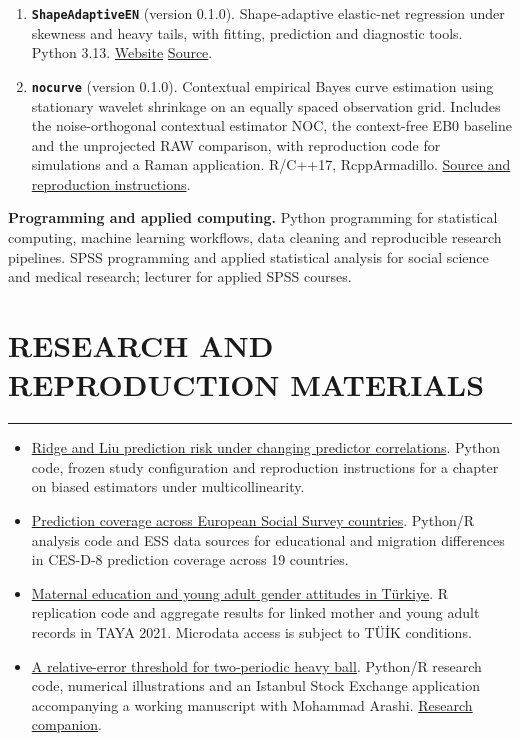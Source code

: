 \documentclass[10pt,letterpaper]{article}
\newcommand{\NewPart}[2]{%
	\Needspace{7\baselineskip}%
	\vspace{0.45em}%
	\section*{\sffamily\large\bfseries\color{MidnightBlue}\uppercase{#1} #2}%
	\vspace{-0.7em}\noindent\color{MidnightBlue}\rule{\textwidth}{0.55pt}\color{Black}\vspace{0.25em}}
\newenvironment{etaremune}{\begin{enumerate}}{\end{enumerate}}
\begin{document}
\begin{etaremune}
\item \textbf{\texttt{ShapeAdaptiveEN}} (version 0.1.0). Shape-adaptive elastic-net regression under skewness and heavy tails, with fitting, prediction and diagnostic tools. Python 3.13. \href{https://byuzbasi.github.io/shape-adaptive-robust-regression/}{Website} \textbar{} \href{https://github.com/byuzbasi/shape-adaptive-robust-regression}{Source}.

\item \textbf{\texttt{nocurve}} (version 0.1.0). Contextual empirical Bayes curve estimation using stationary wavelet shrinkage on an equally spaced observation grid. Includes the noise-orthogonal contextual estimator NOC, the context-free EB0 baseline and the unprojected RAW comparison, with reproduction code for simulations and a Raman application. R/C++17, RcppArmadillo. \href{https://github.com/byuzbasi/nocurve}{Source and reproduction instructions}.

\end{etaremune}

\smallskip
\noindent\textbf{Programming and applied computing.} Python programming for statistical computing, machine learning workflows, data cleaning and reproducible research pipelines. SPSS programming and applied statistical analysis for social science and medical research; lecturer for applied SPSS courses.


\NewPart{Research and Reproduction Materials}{}
\begin{itemize}
\item \href{https://github.com/byuzbasi/ridge-liu-correlation-risk}{Ridge and Liu prediction risk under changing predictor correlations}. Python code, frozen study configuration and reproduction instructions for a chapter on biased estimators under multicollinearity.
\item \href{https://github.com/byuzbasi/ess-selective-prediction}{Prediction coverage across European Social Survey countries}. Python/R analysis code and ESS data sources for educational and migration differences in CES-D-8 prediction coverage across 19 countries.
\item \href{https://github.com/byuzbasi/taya-maternal-education}{Maternal education and young adult gender attitudes in T\"{u}rkiye}. R replication code and aggregate results for linked mother and young adult records in TAYA 2021. Microdata access is subject to T\"{U}\.{I}K conditions.
\item \href{https://github.com/byuzbasi/periodic-momentum}{A relative-error threshold for two-periodic heavy ball}. Python/R research code, numerical illustrations and an Istanbul Stock Exchange application accompanying a working manuscript with Mohammad Arashi. \href{https://byuzbasi.github.io/periodic-momentum/}{Research companion}.
\end{itemize}
\end{document}
